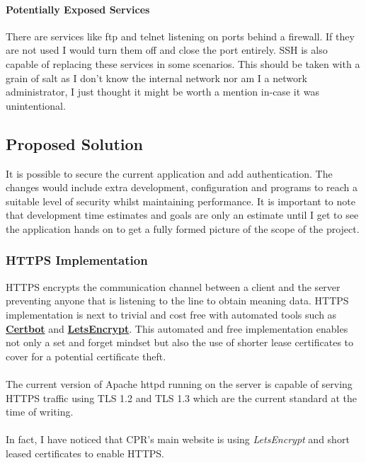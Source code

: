 \paragraph{Potentially Exposed Services}
There are services like ftp and telnet listening on ports behind a firewall.
If they are not used I would turn them off and close the port entirely.
SSH is also capable of replacing these services in some scenarios.
This should be taken with a grain of salt as I don't know the internal network nor
am I a network administrator, I just thought it might be worth a mention in-case it was unintentional.



\pagebreak
\subsection{Proposed Solution}\label{subsec:proposed-solution}
It is possible to secure the current application and add authentication.
The changes would include extra development, configuration and programs to reach a suitable level of security whilst maintaining performance.
It is important to note that development time estimates and goals are only an estimate until I get to see the application hands on to get a fully
formed picture of the scope of the project.

\subsubsection{HTTPS Implementation}
HTTPS encrypts the communication channel between a client and the server preventing anyone that is listening to the line to obtain meaning data.
HTTPS implementation is next to trivial and cost free with automated tools such as \href{https://certbot.eff.org/}{\textbf{Certbot}} and 
\href{https://letsencrypt.org/}{\textbf{LetsEncrypt}}.
This automated and free implementation enables not only a set and forget mindset but also the use of shorter lease certificates to cover for
a potential certificate theft.

\paragraph{}
The current version of Apache httpd running on the server is capable of serving HTTPS traffic using TLS 1.2 and TLS 1.3 which are the current
standard at the time of writing.

\paragraph{}
In fact, I have noticed that CPR's main website is using \emph{LetsEncrypt} and short leased certificates to enable HTTPS.

